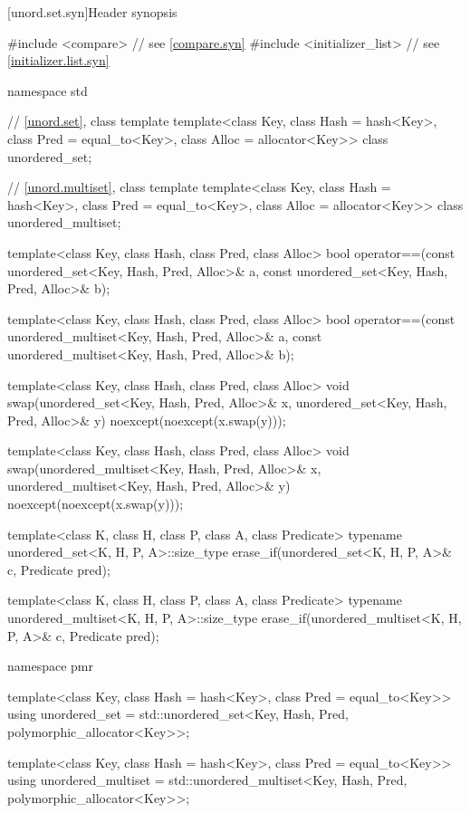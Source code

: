 [unord.set.syn]{Header  synopsis}

%
%
%
\begin{codeblock}
#include <compare>              // see \ref{compare.syn}
#include <initializer_list>     // see \ref{initializer.list.syn}

namespace std {
  // \ref{unord.set}, class template 
  template<class Key,
           class Hash = hash<Key>,
           class Pred = equal_to<Key>,
           class Alloc = allocator<Key>>
    class unordered_set;

  // \ref{unord.multiset}, class template 
  template<class Key,
           class Hash = hash<Key>,
           class Pred = equal_to<Key>,
           class Alloc = allocator<Key>>
    class unordered_multiset;

  template<class Key, class Hash, class Pred, class Alloc>
    bool operator==(const unordered_set<Key, Hash, Pred, Alloc>& a,
                    const unordered_set<Key, Hash, Pred, Alloc>& b);

  template<class Key, class Hash, class Pred, class Alloc>
    bool operator==(const unordered_multiset<Key, Hash, Pred, Alloc>& a,
                    const unordered_multiset<Key, Hash, Pred, Alloc>& b);

  template<class Key, class Hash, class Pred, class Alloc>
    void swap(unordered_set<Key, Hash, Pred, Alloc>& x,
              unordered_set<Key, Hash, Pred, Alloc>& y)
      noexcept(noexcept(x.swap(y)));

  template<class Key, class Hash, class Pred, class Alloc>
    void swap(unordered_multiset<Key, Hash, Pred, Alloc>& x,
              unordered_multiset<Key, Hash, Pred, Alloc>& y)
      noexcept(noexcept(x.swap(y)));

  template<class K, class H, class P, class A, class Predicate>
    typename unordered_set<K, H, P, A>::size_type
      erase_if(unordered_set<K, H, P, A>& c, Predicate pred);

  template<class K, class H, class P, class A, class Predicate>
    typename unordered_multiset<K, H, P, A>::size_type
      erase_if(unordered_multiset<K, H, P, A>& c, Predicate pred);

  namespace pmr {
    template<class Key,
             class Hash = hash<Key>,
             class Pred = equal_to<Key>>
      using unordered_set = std::unordered_set<Key, Hash, Pred,
                                               polymorphic_allocator<Key>>;

    template<class Key,
             class Hash = hash<Key>,
             class Pred = equal_to<Key>>
      using unordered_multiset = std::unordered_multiset<Key, Hash, Pred,
                                                         polymorphic_allocator<Key>>;
  }
}
\end{codeblock}

